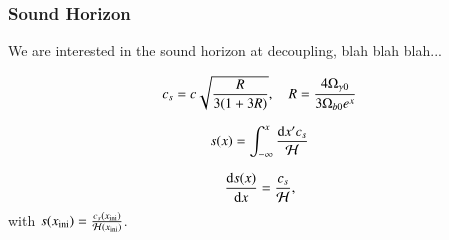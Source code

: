 

\subsubsection{Sound Horizon } \label{sssec:M2:sound_horizon}
We are interested in the sound horizon at decoupling, blah blah blah...


\begin{equation} \label{eq:M2:theory:soundspeed}
    c_s = c \sqrt{\frac{R}{3(1+3R)}},\quad R = \frac{4\Omega_{\gamma 0}}{3\Omega_{b0} e^x}
\end{equation}

\begin{equation} \label{eq:M2:theory:sound_horizon_integral}
    s(x)=\int_{-\infty}^x \frac{\dd x' c_s}{\mathcal{H}}
\end{equation}

\begin{equation} \label{eq:M2:theory:sound_horizon_ode}
    \dv{s(x)}{x} = \frac{c_s}{\mathcal{H}},
\end{equation}
with $s(x_\mathrm{ini})=\frac{c_s(x_\mathrm{ini})}{\mathcal{H}(x_\mathrm{ini})}$.
